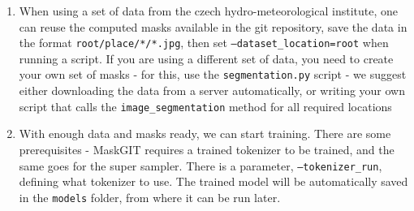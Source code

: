 \begin{enumerate}
    \item When using a set of data from the czech hydro-meteorological institute, one can reuse the computed masks available in the git repository, save the data in the format \texttt{root/place/*/*.jpg}, then set \texttt{--dataset\_location=root} when running a script. If you are using a different set of data, you need to create your own set of masks - for this, use the \texttt{segmentation.py} script - we suggest either downloading the data from a server automatically, or writing your own script that calls the \texttt{image\_segmentation} method for all required locations
    \item With enough data and masks ready, we can start training. There are some prerequisites - MaskGIT requires a trained tokenizer to be trained, and the same goes for the super sampler. There is a parameter, \texttt{--tokenizer\_run}, defining what tokenizer to use. The trained model will be automatically saved in the \texttt{models} folder, from where it can be run later.
\end{enumerate}

